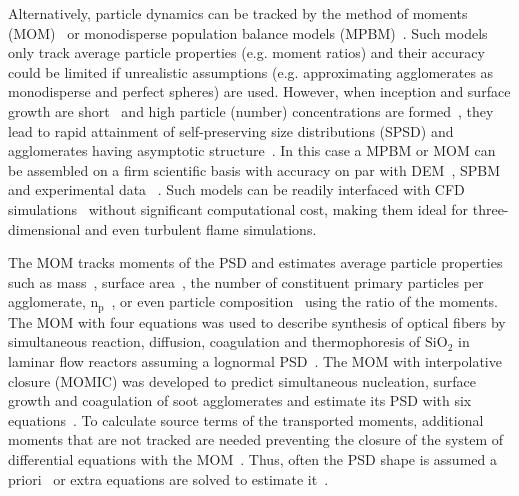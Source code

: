 Alternatively, particle dynamics can be tracked by the method of moments (MOM)~\citep{kazakov1998dynamic} or monodisperse population balance models (MPBM)~\citep{kruis1993simple}. Such models only track average particle properties (e.g. moment ratios) and their accuracy could be limited if unrealistic assumptions (e.g. approximating agglomerates as monodisperse and perfect spheres) are used. However, when inception and surface growth are short~\citep{Spicer2002} and high particle (number) concentrations are formed~\cite{Kelesidis2017}, they lead to rapid attainment of self-preserving size distributions (SPSD) and agglomerates having asymptotic structure~\citep{Goudeli2016}. In this case a MPBM or MOM can be assembled on a firm scientific basis with accuracy on par with DEM~\citep{Kelesidis2017Flame}, SPBM~\citep{kelesidis2019estimating} and experimental data ~\citep{abid2008evolution, ma2013soot, camacho2015mobility}. Such models can be readily interfaced with CFD simulations~\citep{grohn2012fluid} without significant computational cost, making them ideal for three-dimensional and even turbulent flame simulations. 

The MOM tracks moments of the PSD and estimates average particle properties such as mass~\citep{pratsinis1988simultaneous}, surface area~\citep{blanquart2009joint}, the number of constituent primary particles per agglomerate, $\mathrm{n_p}$~\citep{kazakov1998dynamic}, or even particle composition~\citep{blanquart2009analyzing} using the ratio of the moments. The MOM with four equations was used to describe synthesis of optical fibers by simultaneous reaction, diffusion, coagulation and thermophoresis of $\mathrm{SiO_2}$ in laminar flow reactors assuming a lognormal PSD~\citep{kim1988manufacture}. The MOM with interpolative closure (MOMIC) was developed to predict simultaneous nucleation, surface growth and coagulation of soot agglomerates and estimate its PSD with six equations~\citep{kazakov1998dynamic}. To calculate source terms of the transported moments, additional moments that are not tracked are needed preventing the closure of the system of differential equations with the MOM~\citep{pratsinis1988simultaneous, frenklach1987aerosol}. Thus, often the PSD shape is assumed a priori~\citep{pratsinis1988simultaneous} or extra equations are solved to estimate it~\citep{kruis1993simple}.

